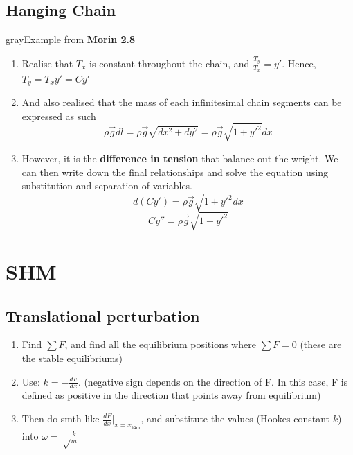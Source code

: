 \subsection{Hanging Chain}
\begin{mybox}{gray}{Example from \textbf{Morin 2.8}}
    \begin{enumerate}
        \item Realise that $T_x$ is constant throughout the chain, and $\frac{T_y}{T_x}=y'$. Hence, $T_y=T_x y' = C y'$
        \item And also realised that the mass of each infinitesimal chain segments can be expressed as such
              \begin{equation}
                  \rho \vec{g} dl= \rho \vec{g} \sqrt {dx^2+dy^2}=\rho \vec{g} \sqrt {1+y'^2}dx
              \end{equation}
        \item However, it is the \textbf{difference in tension} that balance out the wright. We can then write down the final relationships and solve the equation using substitution and separation of variables.
              \begin{equation}
                  d(Cy')= \rho \vec{g} \sqrt {1+y'^2}dx
              \end{equation}
              \begin{equation}
                  C y''= \rho \vec{g} \sqrt {1+y'^2}
              \end{equation}
    \end{enumerate}
\end{mybox}

\section{SHM}
\subsection{Translational perturbation}
\begin{enumerate}
    \item Find $\sum F$, and find all the equilibrium positions where $\sum F=0$ (these are the stable equilibriums)
    \item Use: $k=-\frac{dF}{dx}$. (negative sign depends on the direction of F. In this case, F is defined as positive in the direction that points away from equilibrium)
    \item Then do smth like $\frac{dF}{dx}\big|_{x=x_{\textsf{eqm}}}$, and substitute the values (Hookes constant $k$) into $\omega = \sqrt \frac{k}{m}$
\end{enumerate}

